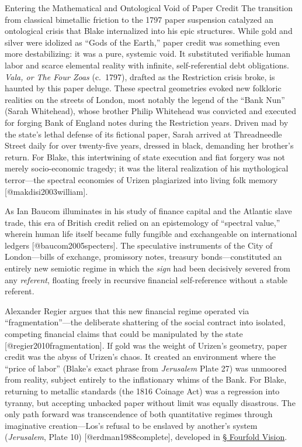 \documentclass[
  ignorenonframetext,
]{beamer}
\begin{document}
\begin{frame}{Entering the Mathematical and Ontological Void of Paper
Credit}
\protect{}\label{entering-the-mathematical-and-ontological-void-of-paper-credit}
The transition from classical bimetallic friction to the 1797 paper
suspension catalyzed an ontological crisis that Blake internalized into
his epic structures. While gold and silver were idolized as ``Gods of
the Earth,'' paper credit was something even more destabilizing: it was
a pure, systemic void. It substituted verifiable human labor and scarce
elemental reality with infinite, self-referential debt obligations.
\emph{Vala, or The Four Zoas} (c.~1797), drafted as the Restriction
crisis broke, is haunted by this paper deluge. These spectral geometries
evoked new folkloric realities on the streets of London, most notably
the legend of the ``Bank Nun'' (Sarah Whitehead), whose brother Philip
Whitehead was convicted and executed for forging Bank of England notes
during the Restriction years. Driven mad by the state's lethal defense
of its fictional paper, Sarah arrived at Threadneedle Street daily for
over twenty-five years, dressed in black, demanding her brother's
return. For Blake, this intertwining of state execution and fiat forgery
was not merely socio-economic tragedy; it was the literal realization of
his mythological terror---the spectral economies of Urizen plagiarized
into living folk memory {[}@makdisi2003william{]}.

As Ian Baucom illuminates in his study of finance capital and the
Atlantic slave trade, this era of British credit relied on an
epistemology of ``spectral value,'' wherein human life itself became
fully fungible and exchangeable on international ledgers
{[}@baucom2005specters{]}. The speculative instruments of the City of
London---bills of exchange, promissory notes, treasury
bonds---constituted an entirely new semiotic regime in which the
\emph{sign} had been decisively severed from any \emph{referent},
floating freely in recursive financial self-reference without a stable
referent.

Alexander Regier argues that this new financial regime operated via
``fragmentation''---the deliberate shattering of the social contract
into isolated, competing financial claims that could be manipulated by
the state {[}@regier2010fragmentation{]}. If gold was the weight of
Urizen's geometry, paper credit was the abyss of Urizen's chaos. It
created an environment where the ``price of labor'' (Blake's exact
phrase from \emph{Jerusalem} Plate 27) was unmoored from reality,
subject entirely to the inflationary whims of the Bank. For Blake,
returning to metallic standards (the 1816 Coinage Act) was a regression
into tyranny, but accepting unbacked paper without limit was equally
disastrous. The only path forward was transcendence of both quantitative
regimes through imaginative creation---Los's refusal to be enslaved by
another's system (\emph{Jerusalem}, Plate 10) {[}@erdman1988complete{]},
developed in \hyperlink{sec-four-levels-vision}{§ Fourfold Vision}.
\end{frame}
\end{document}
